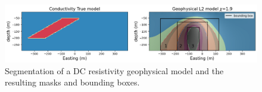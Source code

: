\begin{figure}[htb]
    \vspace{-0.1cm}
    \begin{center}
    \includegraphics[width=\columnwidth]{figures/seg-mask-bbox.png}
    \end{center}
    \vspace{-0.5cm}
\caption{
    Segmentation of a DC resistivity geophysical model and the resulting masks and bounding boxes.
}
\label{fig:segmaskyboundbox}
\vspace{-0.1cm}
\end{figure}

